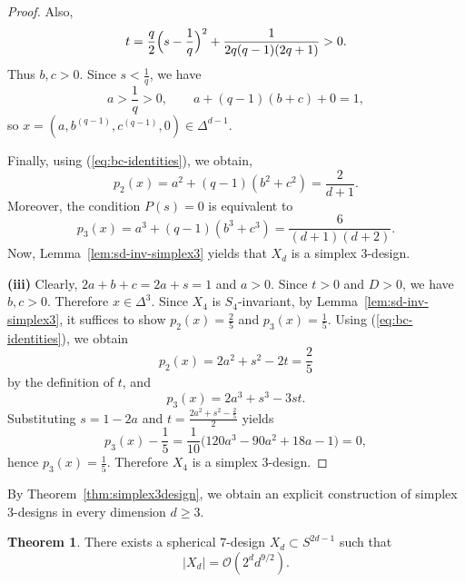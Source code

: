 \documentclass{amsart}
\theoremstyle{definition}
\newtheorem{theorem}{Theorem}[section]
\theoremstyle{remark}
\numberwithin{equation}{section}
\begin{document}
\begin{proof}
Also,
\[
t=\frac{q}{2}\Bigl(s-\frac1q\Bigr)^2+\frac{1}{2q(q-1)(2q+1)}>0.
\]
Thus $b,c>0$.
Since $s<\frac1q$, we have
\[
a>\frac1q>0,
\qquad
a+(q-1)(b+c)+0=1,
\]
so $x=(a,b^{(q-1)},c^{(q-1)},0)\in\Delta^{d-1}$.

Finally, using (\ref{eq:bc-identities}), we obtain,
\[
p_2(x)=a^2+(q-1)(b^2+c^2)=\frac{2}{d+1}.
\]
Moreover, the condition $P(s)=0$ is equivalent to
\[
p_3(x)=a^3+(q-1)(b^3+c^3)=\frac{6}{(d+1)(d+2)}.
\]
Now, Lemma~\ref{lem:sd-inv-simplex3} yields that $X_d$ is a simplex $3$-design.


\textbf{(iii)}
Clearly, $2a+b+c=2a+s=1$ and $a>0$. Since $t>0$ and $D>0$, we have $b,c>0$.
Therefore $x\in\Delta^3$.
Since $X_4$ is $S_4$-invariant, by Lemma~\ref{lem:sd-inv-simplex3}, it suffices to show
$p_2(x)=\frac25$ and $p_3(x)=\frac15$.
Using (\ref{eq:bc-identities}), we obtain
\[
p_2(x)=2a^2+s^2-2t=\frac25
\]
by the definition of $t$, and
\[
p_3(x)=2a^3+s^3-3st.
\]
Substituting $s=1-2a$ and $t=\frac{2a^2+s^2-\frac25}{2}$ yields
\[
p_3(x)-\frac15=\frac1{10}\bigl(120a^3-90a^2+18a-1\bigr)=0,
\]
hence $p_3(x)=\frac15$. Therefore $X_4$ is a simplex $3$-design.
\end{proof}


By Theorem~\ref{thm:simplex3design}, we obtain an explicit construction of simplex $3$-designs in every dimension $d\ge3$.

\begin{theorem}\label{thm:sph7-existence-general}
There exists a spherical $7$-design $X_d\subset S^{2d-1}$ such that
\[
|X_d|=\mathcal{O}\!\left(2^{d}d^{9/2}\right).
\]
\end{theorem}
\end{document}
